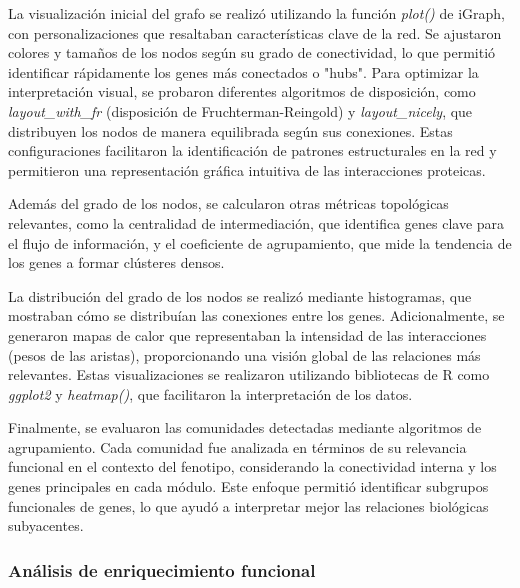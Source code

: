 La visualización inicial del grafo se realizó utilizando la función \textit{plot()} de iGraph, con personalizaciones que resaltaban características clave de la red. Se ajustaron colores y tamaños de los nodos según su grado de conectividad, lo que permitió identificar rápidamente los genes más conectados o "hubs". Para optimizar la interpretación visual, se probaron diferentes algoritmos de disposición, como \textit{layout\_with\_fr} (disposición de Fruchterman-Reingold) y \textit{layout\_nicely}, que distribuyen los nodos de manera equilibrada según sus conexiones. Estas configuraciones facilitaron la identificación de patrones estructurales en la red y permitieron una representación gráfica intuitiva de las interacciones proteicas.

Además del grado de los nodos, se calcularon otras métricas topológicas relevantes, como la centralidad de intermediación, que identifica genes clave para el flujo de información, y el coeficiente de agrupamiento, que mide la tendencia de los genes a formar clústeres densos.

La distribución del grado de los nodos se realizó mediante histogramas, que mostraban cómo se distribuían las conexiones entre los genes. Adicionalmente, se generaron mapas de calor que representaban la intensidad de las interacciones (pesos de las aristas), proporcionando una visión global de las relaciones más relevantes. Estas visualizaciones se realizaron utilizando bibliotecas de R como \textit{ggplot2} y \textit{heatmap()}, que facilitaron la interpretación de los datos.

Finalmente, se evaluaron las comunidades detectadas mediante algoritmos de agrupamiento. Cada comunidad fue analizada en términos de su relevancia funcional en el contexto del fenotipo, considerando la conectividad interna y los genes principales en cada módulo. Este enfoque permitió identificar subgrupos funcionales de genes, lo que ayudó a interpretar mejor las relaciones biológicas subyacentes.

\subsubsection{\textbf{Análisis de enriquecimiento funcional}}






